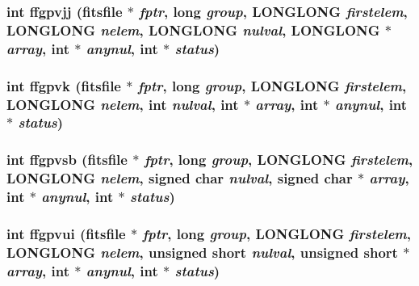 \subsubsection{\setlength{\rightskip}{0pt plus 5cm}int ffgpvjj (\bf{fitsfile} $\ast$ {\em fptr}, long {\em group}, \bf{LONGLONG} {\em firstelem}, \bf{LONGLONG} {\em nelem}, \bf{LONGLONG} {\em nulval}, \bf{LONGLONG} $\ast$ {\em array}, int $\ast$ {\em anynul}, int $\ast$ {\em status})}\label{test_2roimasker_2fitsio_8h_139575618933a88582c86f742063f0c4}


\subsubsection{\setlength{\rightskip}{0pt plus 5cm}int ffgpvk (\bf{fitsfile} $\ast$ {\em fptr}, long {\em group}, \bf{LONGLONG} {\em firstelem}, \bf{LONGLONG} {\em nelem}, int {\em nulval}, int $\ast$ {\em array}, int $\ast$ {\em anynul}, int $\ast$ {\em status})}\label{test_2roimasker_2fitsio_8h_0cbefb3447c77eb4e19523c9c0f36464}


\subsubsection{\setlength{\rightskip}{0pt plus 5cm}int ffgpvsb (\bf{fitsfile} $\ast$ {\em fptr}, long {\em group}, \bf{LONGLONG} {\em firstelem}, \bf{LONGLONG} {\em nelem}, signed char {\em nulval}, signed char $\ast$ {\em array}, int $\ast$ {\em anynul}, int $\ast$ {\em status})}\label{test_2roimasker_2fitsio_8h_c16f3f63bcf3165ea08e680e0cf19f3a}


\subsubsection{\setlength{\rightskip}{0pt plus 5cm}int ffgpvui (\bf{fitsfile} $\ast$ {\em fptr}, long {\em group}, \bf{LONGLONG} {\em firstelem}, \bf{LONGLONG} {\em nelem}, unsigned short {\em nulval}, unsigned short $\ast$ {\em array}, int $\ast$ {\em anynul}, int $\ast$ {\em status})}\label{test_2roimasker_2fitsio_8h_6f7dc3a158e748e6a3d31615a8ba9816}


